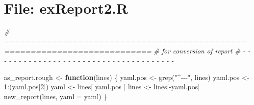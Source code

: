 \documentclass[
]{article}
\newenvironment{Shaded}{\begin{snugshade}}{\end{snugshade}}
\newcommand{\AttributeTok}[1]{\textcolor[rgb]{0.77,0.63,0.00}{#1}}
\newcommand{\CommentTok}[1]{\textcolor[rgb]{0.56,0.35,0.01}{\textit{#1}}}
\newcommand{\ControlFlowTok}[1]{\textcolor[rgb]{0.13,0.29,0.53}{\textbf{#1}}}
\newcommand{\DecValTok}[1]{\textcolor[rgb]{0.00,0.00,0.81}{#1}}
\newcommand{\FunctionTok}[1]{\textcolor[rgb]{0.00,0.00,0.00}{#1}}
\newcommand{\NormalTok}[1]{#1}
\newcommand{\OtherTok}[1]{\textcolor[rgb]{0.56,0.35,0.01}{#1}}
\newcommand{\SpecialCharTok}[1]{\textcolor[rgb]{0.00,0.00,0.00}{#1}}
\newcommand{\StringTok}[1]{\textcolor[rgb]{0.31,0.60,0.02}{#1}}
\begin{document}
\hypertarget{file-exreport2.r}{%
\section{File: exReport2.R}\label{file-exreport2.r}}

\begin{Shaded}
\begin{Highlighting}[]
\CommentTok{\# ==========================================================================}
\CommentTok{\# for conversion of \textquotesingle{}report\textquotesingle{}}
\CommentTok{\# {-} {-} {-} {-} {-} {-} {-} {-} {-} {-} {-} {-} {-} {-} {-} {-} {-} {-} {-} {-} {-} {-} {-} {-} {-} {-} {-} {-} {-} {-} {-} {-} {-} {-} {-} {-} {-}}



\NormalTok{as\_report.rough }\OtherTok{\textless{}{-}} \ControlFlowTok{function}\NormalTok{(lines) \{}
\NormalTok{  yaml.pos }\OtherTok{\textless{}{-}} \FunctionTok{grep}\NormalTok{(}\StringTok{"\^{}{-}{-}{-}"}\NormalTok{, lines)}
\NormalTok{  yaml.pos }\OtherTok{\textless{}{-}} \DecValTok{1}\SpecialCharTok{:}\NormalTok{(yaml.pos[}\DecValTok{2}\NormalTok{])}
\NormalTok{  yaml }\OtherTok{\textless{}{-}}\NormalTok{ lines[ yaml.pos ]}
\NormalTok{  lines }\OtherTok{\textless{}{-}}\NormalTok{ lines[}\SpecialCharTok{{-}}\NormalTok{yaml.pos]}
  \FunctionTok{new\_report}\NormalTok{(lines, }\AttributeTok{yaml =}\NormalTok{ yaml)}
\NormalTok{\}}


\end{Highlighting}
\end{Shaded}
\end{document}

